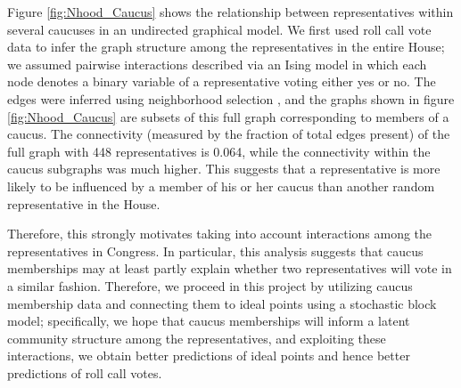 \documentclass[a4paper]{article}
\begin{document}
Figure \ref{fig:Nhood_Caucus} shows the relationship between representatives within several caucuses in an undirected graphical model. We first used roll call vote data to infer the graph structure among the representatives in the entire House; we assumed pairwise interactions described via an Ising model in which each node denotes a binary variable of a representative voting either yes or no. The edges were inferred using neighborhood selection \cite{Hastie2015}, and the graphs shown in figure \ref{fig:Nhood_Caucus} are subsets of this full graph corresponding to members of a caucus. The connectivity (measured by the fraction of total edges present) of the full graph with 448 representatives is 0.064, while the connectivity within the caucus subgraphs was much higher. This suggests that a representative is more likely to be influenced by a member of his or her caucus than another random representative in the House.\par

Therefore, this strongly motivates taking into account interactions among the representatives in Congress. In particular, this analysis suggests that caucus memberships may at least partly explain whether two representatives will vote in a similar fashion. Therefore, we proceed in this project by utilizing caucus membership data and connecting them to ideal points using a stochastic block model; specifically, we hope that caucus memberships will inform a latent community structure among the representatives, and exploiting these interactions, we obtain better predictions of ideal points and hence better predictions of roll call votes. 
\end{document}
